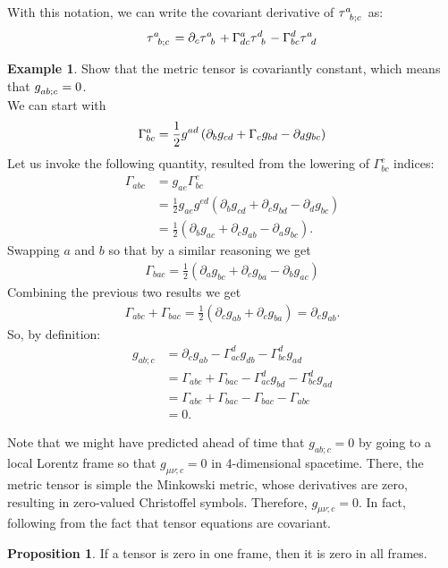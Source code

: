 \documentclass{book}
\theoremstyle{definition}
\newtheorem{prop}{Proposition}[section]
\newtheorem{exmp}{Example}[section]
\begin{document}
With this notation, we can write the covariant derivative of $\tensor{\tau}{^a_{b;c}}$ as:
\begin{align*}
\tensor{\tau}{^a_{b;c}} = \partial_c\tensor{\tau}{^a_b} + \Gamma^a_{dc}\tensor{\tau}{^d_b} - \Gamma^d_{bc}\tensor{\tau}{^a_d}
\end{align*}

\begin{exmp}
	Show that the metric tensor is covariantly constant, which means that $\tensor{g}{_{ab;c}} = 0$.\\
	
	We can start with 
	\begin{align*}
	\Gamma^a_{bc} = \frac{1}{2}\tensor{g}{^{ad}}\left(\partial_bg_{cd} + \Gamma_cg_{bd} - \partial_dg_{bc} \right) 
	\end{align*} 
	Let us invoke the following quantity, resulted from the lowering of $\Gamma^e_{bc}$ indices:
	\begin{align*}
	\Gamma_{abc} &= g_{ae}\Gamma^e_{bc}\\
	&= \frac{1}{2}g_{ae}g^{ed}\left(\partial_bg_{cd} + \partial_cg_{bd} - \partial_dg_{bc} \right) \\
	&= \frac{1}{2}\left(\partial_bg_{ac} + \partial_cg_{ab} -\partial_ag_{bc} \right).
	\end{align*}
	Swapping $a$ and $b$ so that by a similar reasoning we get
	\begin{align*}
	\Gamma_{bac} = \frac{1}{2}\left( \partial_ag_{bc} + \partial_cg_{ba} - \partial_bg_{ac} \right) 
	\end{align*}
	Combining the previous two results we get
	\begin{align*}
	\Gamma_{abc} + \Gamma_{bac} = \frac{1}{2}\left( \partial_cg_{ab} + \partial_cg_{ba}\right) = \partial_cg_{ab}. 
	\end{align*}
	So, by definition:
	\begin{align*}
	g_{ab;c} &= \partial_cg_{ab} - \Gamma^d_{ac}g_{db} - \Gamma^d_{bc}g_{ad}\\
	&= \Gamma_{abc} + \Gamma_{bac} - \Gamma^d_{ac}g_{bd} - \Gamma^d_{bc}g_{ad}\\
	&= \Gamma_{abc} + \Gamma_{bac} - \Gamma_{bac} - \Gamma_{abc}\\
	&= 0.
	\end{align*}
\end{exmp}
Note that we might have predicted ahead of time that $g_{ab;c} = 0$ by going to a local Lorentz frame so that $g_{\mu\nu;c} = 0$ in 4-dimensional spacetime. There, the metric tensor is simple the Minkowski metric, whose derivatives are zero, resulting in zero-valued Christoffel symbols. Therefore, $g_{\mu\nu;c} = 0$. In fact, following from the fact that tensor equations are covariant. 
\begin{prop}
	If a tensor is zero in one frame, then it is zero in all frames. 
\end{prop}
\end{document}
